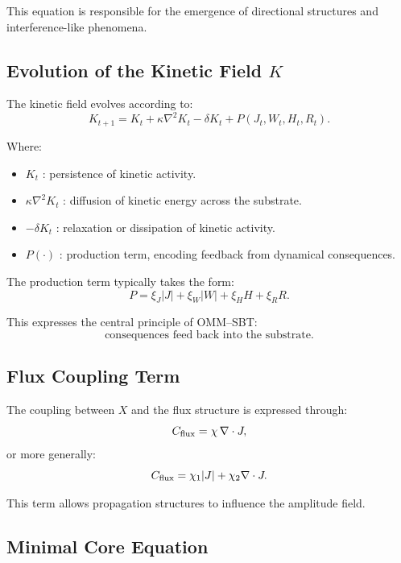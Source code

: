 \documentclass[11pt]{article}
\begin{document}
This equation is responsible for the emergence of directional structures and interference-like phenomena.

\subsection{Evolution of the Kinetic Field $K$}

The kinetic field evolves according to:
\begin{equation}
K_{t+1}
=
K_t
+ \kappa \nabla^2 K_t
- \delta K_t
+ P(J_t, W_t, H_t, R_t).
\end{equation}

Where:

\begin{itemize}
\item $K_t$ : persistence of kinetic activity.
\item $\kappa \nabla^2 K_t$ : diffusion of kinetic energy across the substrate.
\item $-\delta K_t$ : relaxation or dissipation of kinetic activity.
\item $P(\cdot)$ : production term, encoding feedback from dynamical consequences.
\end{itemize}

The production term typically takes the form:
\begin{equation}
P = \xi_J |J| + \xi_W |W| + \xi_H H + \xi_R R.
\end{equation}

This expresses the central principle of OMM--SBT:
\[
\text{consequences feed back into the substrate}.
\]

\subsection{Flux Coupling Term}

The coupling between $X$ and the flux structure is expressed through:
\begin{equation}
C_{\rm flux} = \chi \, \nabla \cdot J,
\end{equation}
or more generally:
\begin{equation}
C_{\rm flux} = \chi_1 |J| + \chi_2 \nabla \cdot J.
\end{equation}

This term allows propagation structures to influence the amplitude field.

\subsection{Minimal Core Equation}
\end{document}
